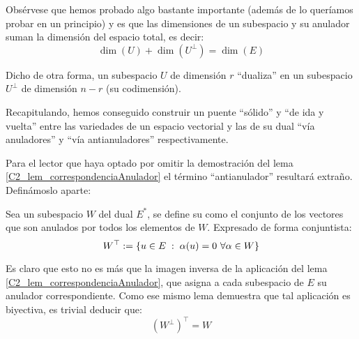 \begin{obs}
	\label{C2_obs_dim_anulador}
	Obsérvese que hemos probado algo bastante importante (además de lo queríamos probar en un principio) y es que las dimensiones de un subespacio y su anulador suman la dimensión del espacio total, es decir:
	\begin{equation}\label{C2_eq_dim_anulador}
	\dim(U)+\dim(U^{\perp})=\dim(E)
	\end{equation}
	
	Dicho de otra forma, un subespacio $U$ de dimensión $r$ ``dualiza'' en un subespacio $U^\perp$ de dimensión $n-r$ (su codimensión).
\end{obs}

Recapitulando, hemos conseguido construir un puente ``sólido'' y ``de ida y vuelta'' entre las variedades de un espacio vectorial y las de su dual ``vía anuladores'' y ``vía antianuladores'' respectivamente.

Para el lector que haya optado por omitir la demostración del lema \ref{C2_lem_correspondenciaAnulador} el término ``antianulador'' resultará extraño. Definámoslo aparte:
\begin{defi}[Antianulador]
	Sea un subespacio $W$ del dual $E^*$, se define su  como el conjunto de los vectores que son anulados por todos los elementos de $W$. Expresado de forma conjuntista:
	\[W^\top:=\{u\in E\;:\; \alpha(u)=0\ \forall\alpha\in W\}\]
\end{defi}

Es claro que esto no es más que la imagen inversa de la aplicación del lema \ref{C2_lem_correspondenciaAnulador}, que asigna a cada subespacio de $E$ su anulador correspondiente. Como ese mismo lema demuestra que tal aplicación es biyectiva, es trivial deducir que:
\begin{equation}
	\label{C2_eq_involutividad}
	(W^{\perp})^{\top}=W
\end{equation}

